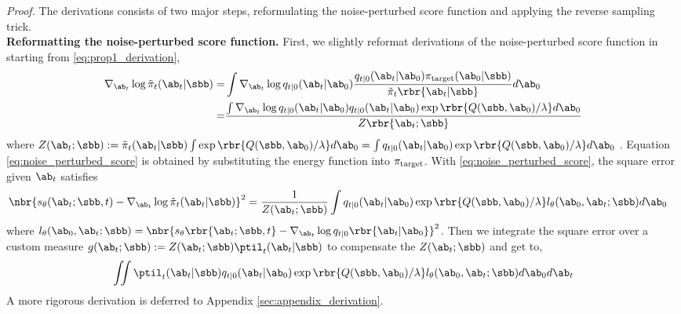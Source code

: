     \textit{Proof.} The derivations consists of two major steps, reformulating the noise-perturbed score function and applying the reverse sampling trick.
    \\\textbf{Reformatting the noise-perturbed score function.} First, we slightly reformat derivations of the noise-perturbed score function in  starting from \eqref{eq:prop1_derivation},
    \begin{equation}
        \begin{aligned}
             \nabla_{\ab_t}\log\tilde\pi_t(\ab_t|\sbb)            = &\int \nabla_{\ab_t}\log q_{t|0}(\ab_t|\ab_0)\frac{q_{t|0}(\ab_t|\ab_0)\pi_{\rm target}(\ab_0|\sbb)}{\tilde\pi_t\rbr{\ab_t|\sbb}}d\ab_0\\
            = & \frac{\int \nabla_{\ab_t}\log q_{t|0}(\ab_t|\ab_0) q_{t|0}(\ab_t|\ab_0)\exp\rbr{Q(\sbb,\ab_0)/\lambda} d\ab_0}{Z\rbr{\ab_t;\sbb}}\\
        \end{aligned}\label{eq:noise_perturbed_score}
    \end{equation}
    where $Z(\ab_t;\sbb) := \tilde{\pi}_t(\ab_t | \sbb) \int\exp\rbr{Q(\sbb,\ab_0)/\lambda} d\ab_0 = \int q_{t | 0}(\ab_t | \ab_0) \exp\rbr{Q(\sbb,\ab_0)/\lambda} d \ab_0 $ .
    Equation \eqref{eq:noise_perturbed_score} is obtained by substituting the energy function into $\pi_{\rm target}$.     With \eqref{eq:noise_perturbed_score}, the square error given $\ab_t$ satisfies
    \begin{equation}
        \begin{aligned}
            &\nbr{s_\theta(\ab_t;\sbb,t) - \nabla_{\ab_t}\log \tilde\pi_t(\ab_t|\sbb)}^2
            = \frac{1}{Z(\ab_t;\sbb)}\int q_{t|0}(\ab_t|\ab_0)\exp\rbr{Q(\sbb,\ab_0)/\lambda}l_\theta(\ab_0,\ab_t;\sbb)d\ab_0
        \end{aligned}
    \end{equation}
    where {$l_\theta(\ab_0,\ab_t;\sbb) = \nbr{s_\theta\rbr{\ab_t; \sbb, t} - \nabla_{\ab_t}\log q_{t|0}\rbr{\ab_t|\ab_0}}^2$}. 
    Then we integrate the square error over a custom measure  $g(\ab_t;\sbb):=Z(\ab_t;\sbb)\ptil_t(\ab_t|\sbb)$ to compensate the $Z(\ab_t;\sbb)$ and get to, 
    \begin{equation}
        \iint\ptil_t(\ab_t|\sbb) q_{t|0}(\ab_t|\ab_0)\exp\rbr{Q(\sbb,\ab_0)/\lambda}l_\theta(\ab_0,\ab_t;\sbb)d\ab_0d\ab_t\label{eq:reformat_loss_p}
    \end{equation}
    A more rigorous derivation is deferred to Appendix \ref{sec:appendix_derivation}. 
    
